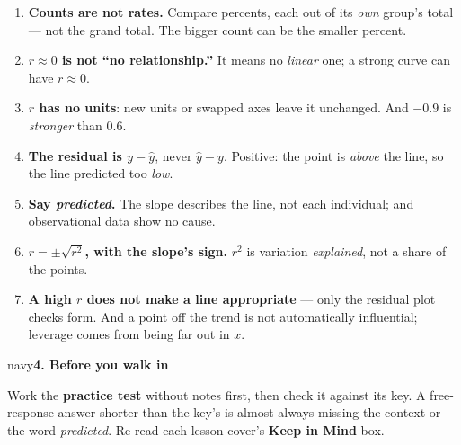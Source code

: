 \documentclass[12pt]{article}
\newcommand{\sghead}[2][10]{%
  \vspace{0.13in}
  \boxguard[#1]
  \begin{headlinebox}{navy}\color{white}\bfseries\small #2\end{headlinebox}
  \vspace{0.09in}}
\begin{document}
\small
\begin{enumerate}[leftmargin=1.6em, itemsep=2pt]
  \item \textbf{Counts are not rates.} Compare percents, each out of its \emph{own} group's
        total --- not the grand total. The bigger count can be the smaller percent.
  \item \textbf{$r \approx 0$ is not ``no relationship.''} It means no \emph{linear} one; a
        strong curve can have $r \approx 0$.
  \item \textbf{$r$ has no units}: new units or swapped axes leave it unchanged. And $-0.9$ is
        \emph{stronger} than $0.6$.
  \item \textbf{The residual is $y - \hat y$}, never $\hat y - y$. Positive: the point is
        \emph{above} the line, so the line predicted too \emph{low}.
  \item \textbf{Say \emph{predicted}.} The slope describes the line, not each individual; and
        observational data show no cause.
  \item \textbf{$r = \pm\sqrt{r^2}$, with the slope's sign.} $r^2$ is variation
        \emph{explained}, not a share of the points.
  \item \textbf{A high $r$ does not make a line appropriate} --- only the residual plot checks
        form. And a point off the trend is not automatically influential; leverage comes from
        being far out in $x$.
\end{enumerate}
\normalsize

\sghead[6]{4. Before you walk in}

\small
Work the \textbf{practice test} without notes first, then check it against its key. A
free-response answer shorter than the key's is almost always missing the context or the word
\emph{predicted}. Re-read each lesson cover's \textbf{Keep in Mind} box.
\normalsize
\end{document}
